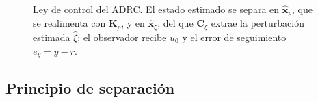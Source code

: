 \begin{figure}[H]
{%
  }
  \caption[Ley de control del ADRC: realimentación de estados y compensación de
    la perturbación]{Ley de control del ADRC. El estado estimado se separa en
    $\hat{\mathbf{x}}_p$, que se realimenta con $\mathbf{K}_p$, y en
    $\hat{\mathbf{x}}_{\xi}$, del que $\mathbf{C}_{\xi}$ extrae la perturbación
    estimada $\hat{\xi}$; el observador recibe $u_0$ y el error de seguimiento
    $e_y = y - r$.}
  \label{fig:adrc_ley}
\end{figure}

\subsection{Principio de separación}
\label{subsec:separacion}

